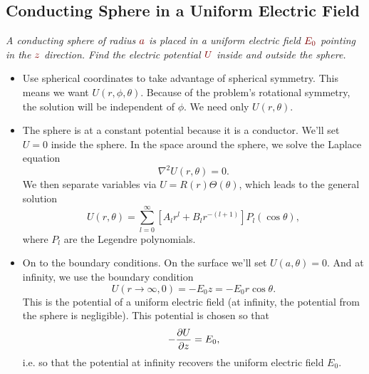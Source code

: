 \documentclass[11pt, a4paper]{article}
\newcommand{\dmath}[1]{\textcolor{Maroon}{#1}}  %
\renewcommand{\laplacian}{\nabla^{2}}
\begin{document}
\subsection{Conducting Sphere in a Uniform Electric Field}
\textit{A conducting sphere of radius $ \dmath{a} $ is placed in a uniform electric field $ \dmath{E_{0}} $ pointing in the $ \dmath{z} $ direction. Find the electric potential $ \dmath{U} $ inside and outside the sphere.} 

\begin{itemize}
	\item Use spherical coordinates to take advantage of spherical symmetry. This means we want $ U(r, \phi, \theta) $. Because of the problem's rotational symmetry, the solution will be independent of $ \phi $. We need only $ U(r, \theta) $. 
	
	\item The sphere is at a constant potential because it is a conductor. We'll set $ U = 0 $ inside the sphere. In the space around the sphere, we solve the Laplace equation
	\begin{equation*}
		\laplacian U(r, \theta) = 0.
	\end{equation*}
	We then separate variables via $ U = R(r)\Theta(\theta) $, which leads to the general solution
	\begin{equation*}
		U(r, \theta) = \sum_{l = 0}^{\infty} \left[A_{l}r^{l}+B_{l}r^{-(l+1)}\right]P_{l}(\cos \theta),
	\end{equation*}
	where $ P_{l} $ are the Legendre polynomials. 
	
	\item On to the boundary conditions. On the surface we'll set $ U(a, \theta) = 0 $. And at infinity, we use the boundary condition 
	\begin{equation*}
		U(r \to \infty, 0) = - E_{0}z = -E_{0}r \cos \theta.
	\end{equation*}
	This is the potential of a uniform electric field (at infinity, the potential from the sphere is negligible). This potential is chosen so that
	\begin{equation*}
		- \pdv{U}{z} = E_{0},
	\end{equation*}
	i.e. so that the potential at infinity recovers the uniform electric field $ E_{0} $. 
	

\end{itemize}
\end{document}
